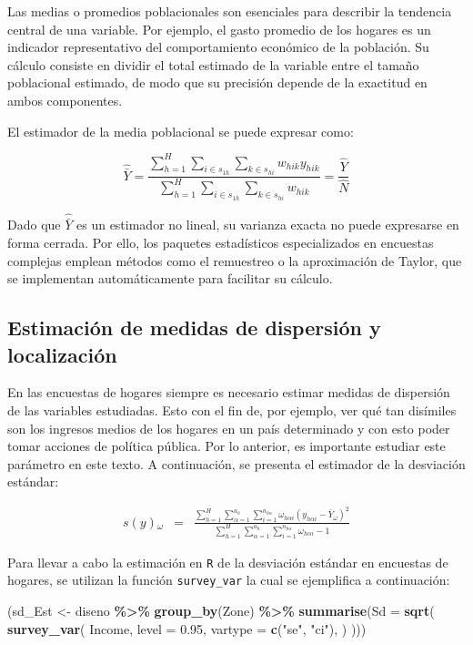 \documentclass[
  spanish,
  12pt,
]{book}
\newenvironment{Shaded}{\begin{snugshade}}{\end{snugshade}}
\newcommand{\AttributeTok}[1]{\textcolor[rgb]{0.13,0.29,0.53}{#1}}
\newcommand{\FloatTok}[1]{\textcolor[rgb]{0.00,0.00,0.81}{#1}}
\newcommand{\FunctionTok}[1]{\textcolor[rgb]{0.13,0.29,0.53}{\textbf{#1}}}
\newcommand{\NormalTok}[1]{#1}
\newcommand{\OtherTok}[1]{\textcolor[rgb]{0.56,0.35,0.01}{#1}}
\newcommand{\SpecialCharTok}[1]{\textcolor[rgb]{0.81,0.36,0.00}{\textbf{#1}}}
\newcommand{\StringTok}[1]{\textcolor[rgb]{0.31,0.60,0.02}{#1}}
\begin{document}
Las medias o promedios poblacionales son esenciales para describir la tendencia central de una variable. Por ejemplo, el gasto promedio de los hogares es un indicador representativo del comportamiento económico de la población. Su cálculo consiste en dividir el total estimado de la variable entre el tamaño poblacional estimado, de modo que su precisión depende de la exactitud en ambos componentes.

El estimador de la media poblacional se puede expresar como:

\[
\widehat{\bar{Y}} = \frac{\displaystyle \sum_{h=1}^{H} \sum_{i \in s_{1h}} \sum_{k \in s_{hi}} w_{hik} y_{hik}} {\displaystyle \sum_{h=1}^{H} \sum_{i \in s_{1h}} \sum_{k \in s_{hi}} w_{hik}} = \frac{\hat{Y}}{\hat{N}}
\]

Dado que \(\widehat{\bar{Y}}\) es un estimador no lineal, su varianza exacta no puede expresarse en forma cerrada. Por ello, los paquetes estadísticos especializados en encuestas complejas emplean métodos como el remuestreo o la aproximación de Taylor, que se implementan automáticamente para facilitar su cálculo.

\subsection{Estimación de medidas de dispersión y localización}\label{estimaciuxf3n-de-medidas-de-dispersiuxf3n-y-localizaciuxf3n}

En las encuestas de hogares siempre es necesario estimar medidas de dispersión de las variables estudiadas. Esto con el fin de, por ejemplo, ver qué tan disímiles son los ingresos medios de los hogares en un país determinado y con esto poder tomar acciones de política pública. Por lo anterior, es importante estudiar este parámetro en este texto. A continuación, se presenta el estimador de la desviación estándar:

\begin{eqnarray}
s\left(y\right){}_{\omega} & = & \frac{\sum_{h=1}^{H}\sum_{\alpha=1}^{a_{h}}\sum_{i=1}^{n_{h\alpha}}\omega_{h\alpha i}\left(y_{h\alpha i}-\bar{Y}_{\omega}\right)^{2}}{\sum_{h=1}^{H}\sum_{\alpha=1}^{a_{h}}\sum_{i=1}^{n_{h\alpha}}\omega_{h\alpha i}-1}
\end{eqnarray}

Para llevar a cabo la estimación en \texttt{R} de la desviación estándar en encuestas de hogares, se utilizan la función \texttt{survey\_var} la cual se ejemplifica a continuación:

\begin{Shaded}
\begin{Highlighting}[]
\NormalTok{(sd\_Est }\OtherTok{\textless{}{-}}\NormalTok{ diseno }\SpecialCharTok{\%\textgreater{}\%} \FunctionTok{group\_by}\NormalTok{(Zone) }\SpecialCharTok{\%\textgreater{}\%}
   \FunctionTok{summarise}\NormalTok{(}\AttributeTok{Sd =} \FunctionTok{sqrt}\NormalTok{(}
  \FunctionTok{survey\_var}\NormalTok{(}
\NormalTok{    Income,}
    \AttributeTok{level =} \FloatTok{0.95}\NormalTok{,}
    \AttributeTok{vartype =}  \FunctionTok{c}\NormalTok{(}\StringTok{"se"}\NormalTok{, }\StringTok{"ci"}\NormalTok{),}
\NormalTok{  ) )))}
\end{Highlighting}
\end{Shaded}
\end{document}
